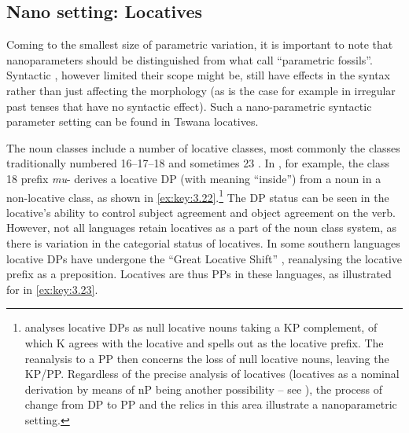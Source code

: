 \documentclass[output=paper]{langsci/langscibook}
\begin{document}
\subsection{Nano setting: Locatives}\label{sub:3.2.4}

Coming to the smallest size of parametric variation, it is important to note
that nanoparameters should be distinguished from what \citet[9]{BibRob2015b}
call “parametric fossils”. Syntactic , however limited their scope
might be, still have effects in the syntax rather than just affecting the
morphology (as is the case for example in irregular past tenses that have no
syntactic effect). Such a nano-parametric syntactic parameter setting can be
found in Tswana locatives.

The  noun classes include a number of locative classes, most
commonly the classes traditionally numbered 16--17--18 and sometimes 23
\citep{Meeussen1967}.  In , for example, the class 18 prefix
\emph{mu}- derives a locative DP (with meaning \enquote{inside}) from a noun in
a non-locative class, as shown in
\eqref{ex:key:3.22}.\footnote{\citet{Carstens1997} analyses locative DPs as
    null locative nouns taking a KP complement, of which K agrees with the
    locative and spells out as the locative prefix. The reanalysis to a PP then
    concerns the loss of null locative nouns, leaving the KP/PP. Regardless of
    the precise analysis of locatives (locatives as a nominal derivation by
    means of nP being another possibility – see ),
the process of change from DP to PP and the relics in this area illustrate a
nanoparametric setting.} The DP status can be seen in the locative’s ability to
control subject agreement and object
agreement on the verb. However, not all
languages retain locatives as a part of the noun class system, as there is
variation in the categorial status of locatives. In some southern 
languages locative DPs have undergone the \enquote{Great Locative Shift}
\citep{Marten2010}, reanalysing the locative prefix as a preposition. Locatives
are thus PPs in these languages, as illustrated for  in
\eqref{ex:key:3.23}.%
\end{document}
